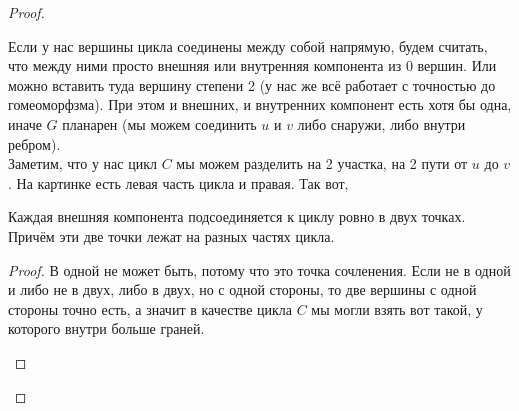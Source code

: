 \documentclass{article}
\begin{document}
\begin{proof}
\begin{figure}[H]
        \end{figure}\noindent
        Если у нас вершины цикла соединены между собой напрямую, будем считать, что между ними просто внешняя или внутренняя компонента из 0 вершин. Или можно вставить туда вершину степени 2 (у нас же всё работает с точностью до гомеоморфзма). При этом и внешних, и внутренних компонент есть хотя бы одна, иначе $G$ планарен (мы можем соединить $u$ и $v$ либо снаружи, либо внутри ребром).\\
        Заметим, что у нас цикл $C$ мы можем разделить на 2 участка, на 2 пути от $u$ до $v$. На картинке есть левая часть цикла и правая. Так вот,
        \begin{lemma}
            Каждая внешняя компонента подсоединяется к циклу ровно в двух точках. Причём эти две точки лежат на разных частях цикла.
        \end{lemma}
        \begin{proof}
            В одной не может быть, потому что это точка сочленения. Если не в одной и либо не в двух, либо в двух, но с одной стороны, то две вершины с одной стороны точно есть, а значит в качестве цикла $C$ мы могли взять вот такой, у которого внутри больше граней.
            \begin{figure}[H]
                \begin{tikzpicture}[x=0.75pt,y=0.75pt,yscale=-1,xscale=1]

\end{tikzpicture}
\end{figure}
\end{proof}
\end{proof}
\end{document}

